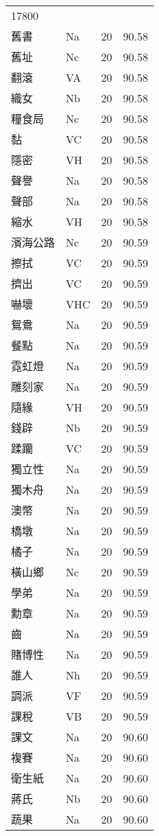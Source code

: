 \documentclass[twocolumn]{book}
\begin{document}
\begin{supertabular}{llrr}
17800\\
舊書 & Na & 20 &  90.58\\
舊址 & Nc & 20 &  90.58\\
翻滾 & VA & 20 &  90.58\\
織女 & Nb & 20 &  90.58\\
糧食局 & Nc & 20 &  90.58\\
黏 & VC & 20 &  90.58\\
隱密 & VH & 20 &  90.58\\
聲譽 & Na & 20 &  90.58\\
聲部 & Na & 20 &  90.58\\
縮水 & VH & 20 &  90.58\\
濱海公路 & Nc & 20 &  90.59\\
擦拭 & VC & 20 &  90.59\\
擠出 & VC & 20 &  90.59\\
嚇壞 & VHC & 20 &  90.59\\
鴛鴦 & Na & 20 &  90.59\\
餐點 & Na & 20 &  90.59\\
霓虹燈 & Na & 20 &  90.59\\
雕刻家 & Na & 20 &  90.59\\
隨緣 & VH & 20 &  90.59\\
錢辟 & Nb & 20 &  90.59\\
蹂躪 & VC & 20 &  90.59\\
獨立性 & Na & 20 &  90.59\\
獨木舟 & Na & 20 &  90.59\\
澳幣 & Na & 20 &  90.59\\
橋墩 & Na & 20 &  90.59\\
橘子 & Na & 20 &  90.59\\
橫山鄉 & Nc & 20 &  90.59\\
學弟 & Na & 20 &  90.59\\
勳章 & Na & 20 &  90.59\\
齒 & Na & 20 &  90.59\\
賭博性 & Na & 20 &  90.59\\
誰人 & Nh & 20 &  90.59\\
調派 & VF & 20 &  90.59\\
課稅 & VB & 20 &  90.59\\
課文 & Na & 20 &  90.60\\
複賽 & Na & 20 &  90.60\\
衛生紙 & Na & 20 &  90.60\\
蔣氏 & Nb & 20 &  90.60\\
蔬果 & Na & 20 &  90.60\\

\end{supertabular}
\end{document}
